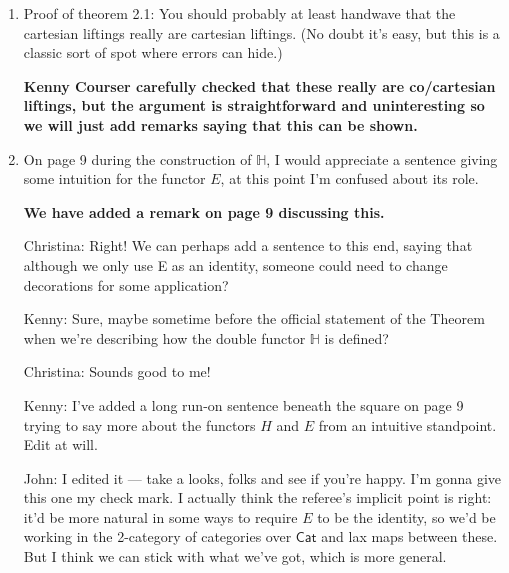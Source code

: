 \documentclass[reqno]{amsart}
\def\chris{\color{purple} Christina: }
\def\john{\color{red} John: }
\def\kenny{\color{blue} Kenny: }
\begin{document}
\begin{enumerate}

\item Proof of theorem 2.1: You should probably at least handwave that the cartesian liftings really are cartesian liftings. (No doubt it’s easy, but 
this 
is a classic sort of spot where errors can hide.)

\textbf{Kenny Courser carefully checked that these really are co/cartesian liftings, but the argument is straightforward and uninteresting so we will just 
add remarks saying that this can be shown.}   

 

\iffalse
{\kenny I think we originally had these details in our proof (of both Theorem 2.1 and Theorem 3.1) but removed them.}

{\john It's your evil advisor who removed those details.   I'll ``handwave it''---see above.}
\fi

\item On page 9 during the construction of $\mathbb{H}$, I would appreciate a sentence giving some intuition for the functor $E$, at this point I’m confused about  its  role.

{\bf  We have added a remark on page 9 discussing this.} 

 

\iffalse
{}

{\chris Right! We can perhaps add a sentence to this end, saying that although we only use E as an identity, someone could need to change 
decorations 
for some application?}

{\kenny Sure, maybe sometime before the official statement of the Theorem when we're describing how the double functor $\mathbb{H}$ is defined?}

{\chris Sounds good to me!}

{\kenny I've added a long run-on sentence beneath the square on page 9 trying to say more about the functors $H$ and $E$ from an intuitive standpoint. Edit at will.}

{\john I edited it --- take a looks, folks and see if you're happy. I'm gonna give this one my check mark.  I actually think the referee's implicit point is right: it'd be more natural in some ways to require $E$ to be the identity, so we'd be working in the 2-category of categories over $\mathsf{Cat}$ and lax maps between these.  But I think we can stick with what we've got,
which is more general.}


\end{enumerate}
\end{document}
